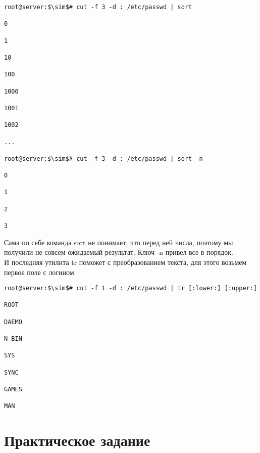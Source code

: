 \documentclass[14pt, a4paper]{article}
\begin{document}
\vspace{0.3cm}

\begin{lstlisting}
root@server:$\sim$# cut -f 3 -d : /etc/passwd | sort

0

1

10

100

1000

1001

1002

...

root@server:$\sim$# cut -f 3 -d : /etc/passwd | sort -n

0

1

2

3

\end{lstlisting}
\vspace{0.2cm}

Сама по себе команда sort не понимает, что перед ней числа, поэтому мы получили не совсем
ожидаемый результат. Ключ -n привел все в порядок.\\

И последняя утилита tr поможет с преобразованием текста, для этого возьмем первое поле с логином.

\vspace{0.3cm}
\begin{lstlisting}
root@server:$\sim$# cut -f 1 -d : /etc/passwd | tr [:lower:] [:upper:]

ROOT

DAEMO

N BIN

SYS

SYNC

GAMES

MAN

\end{lstlisting}



\section*{Практическое задание} 
\end{document}
